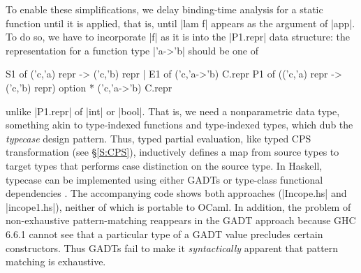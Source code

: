 To enable these simplifications, we delay binding-time analysis
for a static function until it is applied, that is, until |lam f|
appears as the argument of |app|.  To do so, we have to incorporate |f|
as it is into the |P1.repr| data structure: the representation
for a function type |'a->'b| should be one of
\begin{code}
S1 of ('c,'a) repr -> ('c,'b) repr | E1 of ('c,'a->'b) C.repr
P1 of (('c,'a) repr -> ('c,'b) repr) option * ('c,'a->'b) C.repr
\end{code}
unlike |P1.repr| of |int| or |bool|.
That is, we need a nonparametric data type, something akin to
type-indexed functions and type-indexed types, which
\citet{oliveira-typecase} dub the \emph{typecase} design pattern.
Thus, typed partial evaluation, like typed CPS transformation
(see \S\ref{S:CPS}),
inductively defines a map from source types to target types that
performs case distinction on the source type. In Haskell, typecase
can be implemented using either GADTs or
type-class functional dependencies
\citep{oliveira-typecase}. The accompanying code shows both
approaches (|Incope.hs| and |incope1.hs|), 
neither of which is portable to OCaml. In addition,
the problem of non\hyp exhaustive pattern\hyp matching reappears in
the GADT approach because GHC 6.6.1 cannot see that a particular
type of a GADT value precludes certain constructors.
Thus GADTs fail to
make it \emph{syntactically} apparent that pattern matching is exhaustive.




